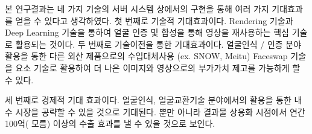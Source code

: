 \documentclass[chapter,oneside]{oblivoir}
\begin{document}
\vspace{0.5cm}

본 연구결과는 네 가지 기술의 서버 시스템 상에서의 구현을 통해 여러 가지 기대효과를 얻을 수 있다고 생각하였다. 첫 번째로 기술적 기대효과이다. Rendering 기술과 Deep Learning 기술을 통하여 얼굴 인증 및 합성을 통해 영상을 재사용하는 핵심 기술로 활용되는 것이다.
두 번째로 기술이전을 통한 기대효과이다. 얼굴인식 / 인증 분야 활용을 통한 다른 외산 제품으로의 수입대체사용 (ex. SNOW, Meitu) Faceswap 기술을 요소 기술로 활용하여 더 나은 이미지와 영상으로의 부가가치 제고를 가능하게 할 수 있다.

세 번째로 경제적 기대 효과이다. 얼굴인식, 얼굴교환기술 분야에서의 활용을 통한 내수 시장을 공략할 수 있을 것으로 기대된다. 뿐만 아니라 결과물 상용화 시점에서 연간 100억(
모름) 이상의 수출 효과를 낼 수 있을 것으로 보인다.

\newpage
%



















\end{document}
